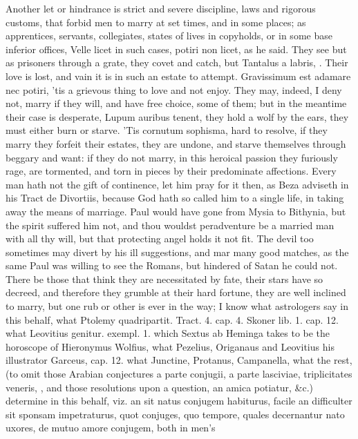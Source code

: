 {Another let or hindrance is strict and severe discipline, laws and
rigorous customs, that forbid men to marry at set times, and in some
places; as apprentices, servants, collegiates, states of lives in
copyholds, or in some base inferior offices, Velle licet in such
cases, potiri non licet, as he said. They see but as prisoners through
a grate, they covet and catch, but Tantalus a labris, \etc{}. Their love is
lost, and vain it is in such an estate to attempt. Gravissimum
est adamare nec potiri, 'tis a grievous thing to love and not enjoy.
They may, indeed, I deny not, marry if they will, and have free choice,
some of them; but in the meantime their case is desperate, Lupum
auribus tenent, they hold a wolf by the ears, they must either burn or
starve. 'Tis cornutum sophisma, hard to resolve, if they marry they
forfeit their estates, they are undone, and starve themselves through
beggary and want: if they do not marry, in this heroical passion they
furiously rage, are tormented, and torn in pieces by their predominate
affections. Every man hath not the gift of continence, let him
pray for it then, as Beza adviseth in his Tract de Divortiis,
because God hath so called him to a single life, in taking away the
means of marriage. Paul would have gone from Mysia to Bithynia,
but the spirit suffered him not, and thou wouldst peradventure be a
married man with all thy will, but that protecting angel holds it not
fit. The devil too sometimes may divert by his ill suggestions, and mar
many good matches, as the same Paul was willing to see the
Romans, but hindered of Satan he could not. There be those that think
they are necessitated by fate, their stars have so decreed, and
therefore they grumble at their hard fortune, they are well inclined to
marry, but one rub or other is ever in the way; I know what astrologers
say in this behalf, what Ptolemy quadripartit. Tract. 4. cap. 4. Skoner
lib. 1. cap. 12. what Leovitius genitur. exempl. 1. which Sextus ab
Heminga takes to be the horoscope of Hieronymus Wolfius, what Pezelius,
Origanaus and Leovitius his illustrator Garceus, cap. 12. what
Junctine, Protanus, Campanella, what the rest, (to omit those Arabian
conjectures a parte conjugii, a parte lasciviae, triplicitates veneris,
\etc{}, and those resolutions upon a question, an amica potiatur, \&c.)
determine in this behalf, viz. an sit natus conjugem habiturus, facile
an difficulter sit sponsam impetraturus, quot conjuges, quo tempore,
quales decernantur nato uxores, de mutuo amore conjugem, both in men's
}
